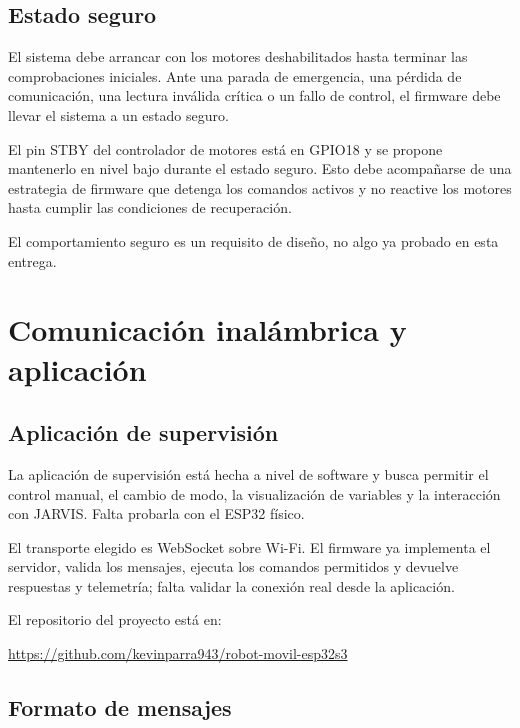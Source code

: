 \documentclass[journal]{IEEEtran}
\begin{document}
\subsection{Estado seguro}

El sistema debe arrancar con los motores deshabilitados hasta terminar las comprobaciones iniciales. Ante una parada de emergencia, una pérdida de comunicación, una lectura inválida crítica o un fallo de control, el firmware debe llevar el sistema a un estado seguro.

El pin STBY del controlador de motores está en GPIO18 y se propone mantenerlo en nivel bajo durante el estado seguro. Esto debe acompañarse de una estrategia de firmware que detenga los comandos activos y no reactive los motores hasta cumplir las condiciones de recuperación.

El comportamiento seguro es un requisito de diseño, no algo ya probado en esta entrega.


\section{Comunicación inalámbrica y aplicación}

\subsection{Aplicación de supervisión}

La aplicación de supervisión está hecha a nivel de software y busca permitir el control manual, el cambio de modo, la visualización de variables y la interacción con JARVIS. Falta probarla con el ESP32 físico.

El transporte elegido es WebSocket sobre Wi-Fi. El firmware ya implementa el servidor, valida los mensajes, ejecuta los comandos permitidos y devuelve respuestas y telemetría; falta validar la conexión real desde la aplicación.

El repositorio del proyecto está en:

\begin{center}
\url{https://github.com/kevinparra943/robot-movil-esp32s3}
\end{center}

\subsection{Formato de mensajes}
\end{document}
